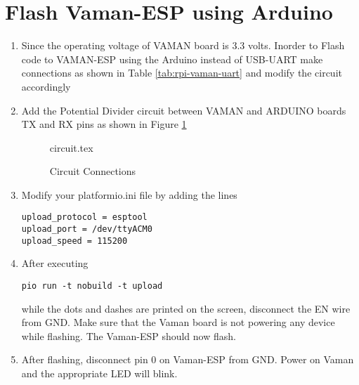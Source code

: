 \documentclass[12pt]{article}
\begin{document}
\section{Flash Vaman-ESP using Arduino}

\renewcommand{\theequation}{\theenumi}
\renewcommand{\thefigure}{\theenumi}
\begin{enumerate}[label=\thesubsection.\arabic*.,ref=\thesubsection.\theenumi]
\item Since the operating voltage of VAMAN board is 3.3 volts. Inorder to Flash code to VAMAN-ESP using the Arduino instead of USB-UART make connections as shown in Table \ref{tab:rpi-vaman-uart} and modify the circuit accordingly
			\begin{table}[!h]
		
		\caption{}
		\label{tab:rpi-vaman-uart}
	\end{table}
\item Add the Potential Divider circuit between VAMAN and ARDUINO boards TX and RX pins as shown in Figure \ref{fig:1}
\begin{figure}
\centering

{circuit.tex}
\caption{Circuit Connections}
\label{fig:1}
\end{figure}
\item Modify your platformio.ini file by adding the lines
\begin{lstlisting}
upload_protocol = esptool
upload_port = /dev/ttyACM0
upload_speed = 115200
\end{lstlisting}

\item After executing 
\begin{lstlisting}
pio run -t nobuild -t upload
\end{lstlisting}
while the dots and dashes are printed on the screen, disconnect the EN wire from GND.   Make sure that the Vaman board is not powering any device while flashing.  The Vaman-ESP should now flash.
\item After flashing, disconnect pin 0 on Vaman-ESP from GND. Power on Vaman and the appropriate LED will blink.
\end{enumerate}
\end{document}
